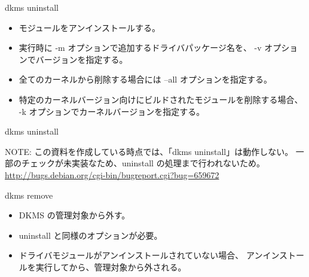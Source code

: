 \begin{frame}[containsverbatim]{dkms uninstall}

\begin{itemize}
\item モジュールをアンインストールする。
\item 実行時に -m オプションで追加するドライバパッケージ名を、
-v オプションでバージョンを指定する。
\item 全てのカーネルから削除する場合には --all オプションを指定する。
\item 特定のカーネルバージョン向けにビルドされたモジュールを削除する場合、
-k オプションでカーネルバージョンを指定する。
\end{itemize}

\end{frame}

\begin{frame}[containsverbatim]{dkms uninstall}


NOTE: この資料を作成している時点では、「dkms uninstall」は動作しない。
一部のチェックが未実装なため、uninstall の処理まで行われないため。\\
\url{http://bugs.debian.org/cgi-bin/bugreport.cgi?bug=659672}

\end{frame}

\begin{frame}[containsverbatim]{dkms remove}

\begin{itemize}
\item DKMS の管理対象から外す。
\item uninstall と同様のオプションが必要。
\item ドライバモジュールがアンインストールされていない場合、
アンインストールを実行してから、管理対象から外される。
\end{itemize}

\end{frame}


